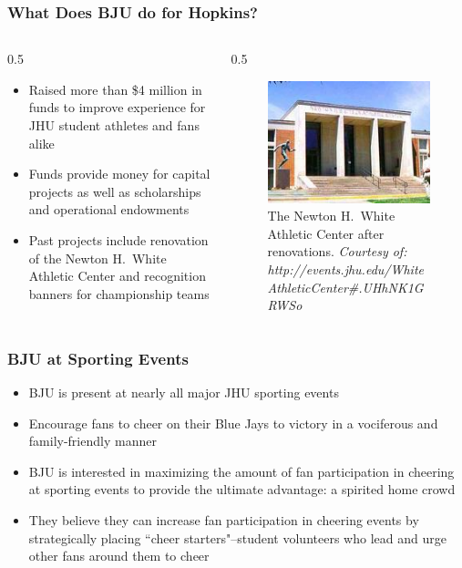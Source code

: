 \documentclass[compress,handout,10pt]{beamer}
\let\olditem\item
\renewcommand{\item}{\setlength{\itemsep}{0.5\baselineskip}\olditem}
\begin{document}
\begin{frame}
	\frametitle{What Does BJU do for Hopkins?}
	\begin {columns}
		\begin {column} {0.5\textwidth}
		\begin {itemize}
			\item Raised more than \$4 million in funds to improve experience for JHU student athletes and fans alike \cite{bjuwebsite}
			\item Funds provide money for capital projects as well as scholarships and operational endowments \cite{bjuwebsite}
			\item Past projects include renovation of the Newton H.~White Athletic Center and recognition banners for championship teams \cite{bjuwebsite}
		\end {itemize}
	\end {column}
	\begin{column} {0.5\textwidth}
		\begin{figure}
			\begin{center}
				\includegraphics [width=2in] {AthleticCenter.jpg}
				\caption{{\tiny The Newton H.~White Athletic Center after renovations. \textit{Courtesy of: http://events.jhu.edu/WhiteAthleticCenter\#.UHhNK1GRWSo}}}
			\end{center}
		\end {figure}
	\end {column}
\end {columns}
\end {frame}

\begin{frame}
\frametitle{BJU at Sporting Events}
\begin{itemize}
\item BJU is present at nearly all major JHU sporting events
\item Encourage fans to cheer on their Blue Jays to victory in a vociferous and family-friendly manner
\item BJU is interested in maximizing the amount of fan participation in cheering at sporting events to provide the ultimate advantage: a spirited home crowd
\item They believe they can increase fan participation in cheering events by strategically placing ``cheer starters"--student volunteers who lead and urge other fans around them to cheer
\end{itemize}
\end{frame}
\end{document}

